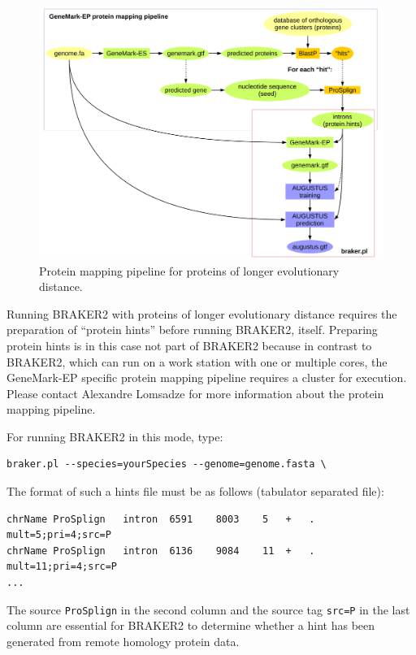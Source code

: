 \documentclass[]{article}
\begin{document}
\begin{figure}[h!]
	\begin{center}
\includegraphics[scale=0.6]{./figs/gatech-prot-pipeline.pdf}
\end{center}
\caption{Protein mapping pipeline for proteins of longer evolutionary distance.\label{gatech}}
\end{figure}

Running BRAKER2 with proteins of longer evolutionary distance requires
the preparation of ``protein hints'' before running BRAKER2, itself.
Preparing protein hints is in this case not part of BRAKER2 because in
contrast to BRAKER2, which can run on a work station with one or
multiple cores, the GeneMark-EP specific protein mapping pipeline
requires a cluster for execution. Please contact Alexandre Lomsadze for
more information about the protein mapping pipeline.

For running BRAKER2 in this mode, type:

\begin{verbatim}
braker.pl --species=yourSpecies --genome=genome.fasta \
\end{verbatim}

The format of such a hints file must be as follows (tabulator separated
file):

\begin{verbatim}
chrName ProSplign   intron  6591    8003    5   +   .   mult=5;pri=4;src=P
chrName ProSplign   intron  6136    9084    11  +   .   mult=11;pri=4;src=P
...
\end{verbatim}

The source \texttt{ProSplign} in the second column and the source tag
\texttt{src=P} in the last column are essential for BRAKER2 to determine
whether a hint has been generated from remote homology protein data.
\end{document}
